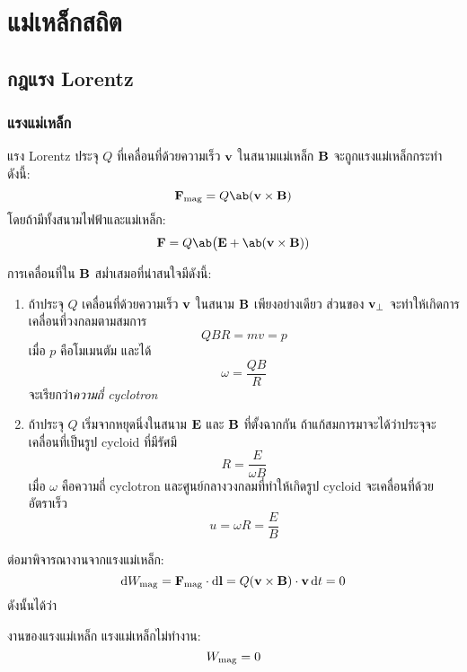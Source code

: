 \chapter{แม่เหล็กสถิต}
\section{กฎแรง Lorentz}
\subsection{แรงแม่เหล็ก}

\begin{lawbox}{แรง Lorentz}
    ประจุ $Q$ ที่เคลื่อนที่ด้วยความเร็ว $\mathbf{v}$ ในสนามแม่เหล็ก $\mathbf{B}$ จะถูกแรงแม่เหล็กกระทำดังนี้:
    \begin{equation}
        \vb{F}_\txt{mag} = Q\ab(\vb{v}\times\vb{B})
    \end{equation}
    โดยถ้ามีทั้งสนามไฟฟ้าและแม่เหล็ก:
    \begin{equation}
        \vb{F} = Q\ab\big(\vb{E} + \ab(\vb{v}\times\vb{B}))
    \end{equation}
\end{lawbox}
การเคลื่อนที่ใน $\mathbf{B}$ สม่ำเสมอที่น่าสนใจมีดังนี้:
\begin{enumerate}
    \item ถ้าประจุ $Q$ เคลื่อนที่ด้วยความเร็ว $\mathbf{v}$ ในสนาม $\mathbf{B}$ เพียงอย่างเดียว ส่วนของ $\mathbf{v}_\perp$ จะทำให้เกิดการเคลื่อนที่วงกลมตามสมการ
    \[
    QBR=mv=p
    \]
    เมื่อ $p$ คือโมเมนตัม และได้
    \[
    \omega = \frac{QB}{R}
    \]
    จะเรียกว่า\emph{ความถี่ cyclotron}
    \item ถ้าประจุ $Q$ เริ่มจากหยุดนิ่งในสนาม $\mathbf{E}$ และ $\mathbf{B}$ ที่ตั้งฉากกัน ถ้าแก้สมการมาจะได้ว่าประจุจะเคลื่อนที่เป็นรูป cycloid ที่มีรัศมี
    \[
    R=\frac{E}{\omega B}
    \]
    เมื่อ $\omega$ คือความถี่ cyclotron และศูนย์กลางวงกลมที่ทำให้เกิดรูป cycloid จะเคลื่อนที่ด้วยอัตราเร็ว
    \[
    u=\omega R=\frac{E}{B}
    \]
\end{enumerate}
ต่อมาพิจารณางานจากแรงแม่เหล็ก:
\[
\odif{W}_\txt{mag}=\vb{F}_\txt{mag}\cdot\odif{\vb{l}}=Q(\vb{v}\times\vb{B})\cdot\vb{v}\odif{t}=0
\]
ดังนั้นได้ว่า
\begin{corbox}{งานของแรงแม่เหล็ก}
    แรงแม่เหล็กไม่ทำงาน:
    \begin{equation}
        W_{\mathrm{mag}}=0
    \end{equation}
\end{corbox}


